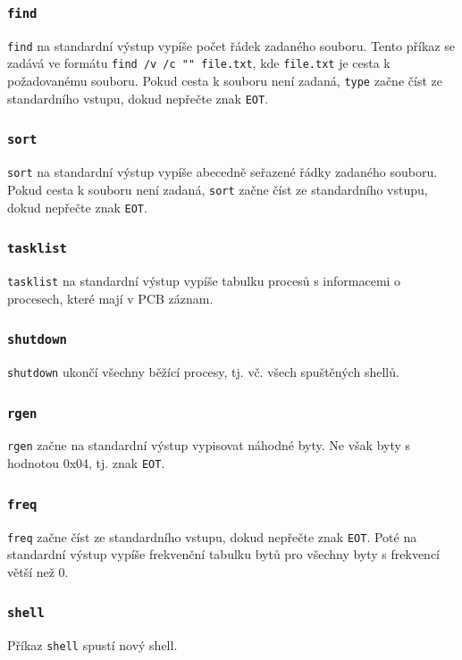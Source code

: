 \documentclass[12pt, a4paper]{article}
\begin{document}
    \subsubsection*{\texttt{find}}
    \texttt{find} na standardní výstup vypíše počet řádek zadaného souboru. Tento příkaz se zadává ve formátu \texttt{find /v /c "{}"{} file.txt}, kde \texttt{file.txt} je cesta k požadovanému souboru. Pokud cesta k souboru není zadaná, \texttt{type} začne číst ze standardního vstupu, dokud nepřečte znak \texttt{EOT}.
    
    \subsubsection*{\texttt{sort}}
    \texttt{sort} na standardní výstup vypíše abecedně seřazené řádky zadaného souboru. Pokud cesta k souboru není zadaná, \texttt{sort} začne číst ze standardního vstupu, dokud nepřečte znak \texttt{EOT}.
    
    \subsubsection*{\texttt{tasklist}}
    \texttt{tasklist} na standardní výstup vypíše tabulku procesů s informacemi o procesech, které mají v PCB záznam.
    
    \subsubsection*{\texttt{shutdown}}
    \texttt{shutdown} ukončí všechny běžící procesy, tj. vč. všech spuštěných shellů.
    
    \subsubsection*{\texttt{rgen}}
    \texttt{rgen} začne na standardní výstup vypisovat náhodné byty. Ne však byty s hodnotou 0x04, tj. znak \texttt{EOT}.
    
    \subsubsection*{\texttt{freq}}
    \texttt{freq} začne číst ze standardního vstupu, dokud nepřečte znak \texttt{EOT}. Poté na standardní výstup vypíše frekvenční tabulku bytů pro všechny byty s frekvencí větší než 0.
    
    \subsubsection*{\texttt{shell}}
    Příkaz \texttt{shell} spustí nový shell.
	
\end{document}
